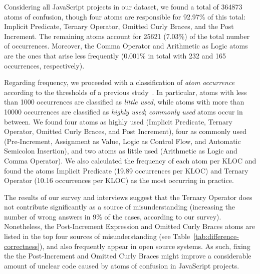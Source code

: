 Considering all JavaScript projects in our dataset, we found 
a total of \num{364873} atoms of confusion, though four atoms are responsible
for 92.97\% of this total: Implicit Predicate, Ternary Operator, Omitted Curly Braces, and the Post Increment. The remaining atoms
account for \num{25621} (7.03\%) of the total number of occurrences.
Moreover, the Comma Operator and Arithmetic as Logic atoms are the ones that arise less
frequently (0.001\% in total with 232 and 165 occurrences, respectively). 

Regarding frequency, we proceeded with a classification of \emph{atom occurrence}
according to the thresholds of a previous
study~\cite{DBLP:journals/ese/MedeirosLAAKRG19}. 
In particular, atoms with less than \num{1000} occurrences are classified as \textit{little used}, while atoms with more than \num{10000} occurrences are classified as \textit{highly used}; \textit{commonly used} atoms occur in between.
We found four
atoms as highly used (Implicit Predicate, Ternary Operator, Omitted Curly Braces, and Post Increment),
four as commonly used (Pre-Increment, Assignment as Value,
Logic as Control Flow, and Automatic Semicolon Insertion),
and two atoms as little used (Arithmetic as Logic and Comma Operator).
We also calculated the frequency of each atom per KLOC and found the atoms
Implicit Predicate (19.89 occurrences per KLOC) and Ternary Operator (10.16
occurrences per KLOC) as the most occurring
in practice.

The results of our survey and interviews suggest that the
Ternary Operator does not contribute significantly as a source of
misunderstanding (increasing the number of wrong answers in 9\% of the cases,
according to our survey). 
Nonetheless, the Post-Increment Expression
and Omitted Curly Braces atoms are listed in the top four sources of misunderstanding 
(see Table~\ref{tab:difference-correctness}), and also frequently appear
in open source systems. As such, fixing the
the Post-Increment and Omitted Curly Braces might improve a considerable
amount of unclear code caused by atoms of confusion in
JavaScript projects. 
